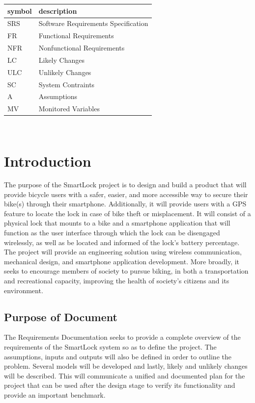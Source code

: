 \documentclass[12pt]{article}
\begin{document}
\renewcommand{\arraystretch}{1.2}
\begin{tabular}{l l} 
  \toprule		
  \textbf{symbol} & \textbf{description}\\
  \midrule 
  SRS & Software Requirements Specification\\
  FR & Functional Requirements\\
  NFR & Nonfunctional Requirements\\
  LC & Likely Changes\\
  ULC & Unlikely Changes\\
  SC & System Contraints\\
  A & Assumptions\\
  MV & Monitored Variables\\
  \bottomrule
\end{tabular}\\






\section{Introduction}

The purpose of the SmartLock project is to design and build a product that will provide bicycle users with a safer, easier, and more accessible way to secure their bike(s) through their smartphone. Additionally, it will provide users with a GPS feature to locate the lock in case of bike theft or misplacement.  It will consist of a physical lock that mounts to a bike and a smartphone application that will function as the user interface through which the lock can be disengaged wirelessly, as well as be located and informed of the lock's battery percentage. The project will provide an engineering solution using wireless communication, mechanical design, and smartphone application development. More broadly, it seeks to encourage members of society to pursue biking, in both a transportation and recreational capacity, improving the health of society’s citizens and its environment.  

\subsection{Purpose of Document}

The Requirements Documentation seeks to provide a complete overview of the requirements of the SmartLock system so as to define the project. The assumptions, inputs and outputs will also be defined in order to outline the problem. Several models will be developed and lastly, likely and unlikely changes will be described. This will communicate a unified and documented plan for the project that can be used after the design stage to verify its functionality and provide an important benchmark. 
\end{document}
